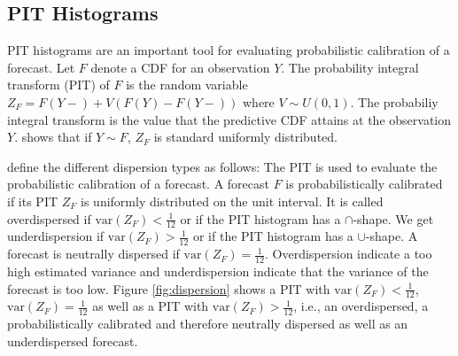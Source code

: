 \subsection{PIT Histograms}
\label{sec:pit-histogram-explanation}

PIT histograms are an important tool for evaluating probabilistic calibration of a forecast. 
Let \(F\) denote a CDF for an observation \(Y\). The probability integral 
transform (PIT) of \(F\) is the random variable \(Z_F = F(Y-) + V(F(Y) - F(Y-))\) 
where \(V \sim U(0,1)\). 
The probabiliy integral transform is the value that the predictive CDF 
attains at the observation \(Y\). \Textcite{Rueschendorf2009} shows that if \(Y \sim F\), \(Z_F\) is standard uniformly distributed.

\Textcite{Gneiting2014} define the different dispersion types as follows:
The PIT is used to evaluate the probabilistic calibration of a forecast. 
A forecast \(F\) is probabilistically calibrated if its PIT \(Z_F\) 
is uniformly distributed on the unit interval. 
It is called overdispersed if \(\mathrm{var}(Z_F) < \frac{1}{12}\) or if 
the PIT histogram has a \(\cap\)-shape. We get underdispersion if 
\(\mathrm{var}(Z_F) > \frac{1}{12}\) or if the PIT histogram has a \(\cup\)-shape. 
A forecast is neutrally dispersed if \(\mathrm{var}(Z_F) = \frac{1}{12}\).
Overdispersion indicate a too high estimated variance and underdispersion indicate 
that the variance of the forecast is too low. 
Figure \ref{fig:dispersion} shows a PIT with \(\mathrm{var}(Z_F) < \frac{1}{12}\), 
\(\mathrm{var}(Z_F) = \frac{1}{12}\) as well as a PIT with \(\mathrm{var}(Z_F) > \frac{1}{12}\), 
i.e., an overdispersed, a probabilistically calibrated and therefore neutrally dispersed as well as an underdispersed forecast.


